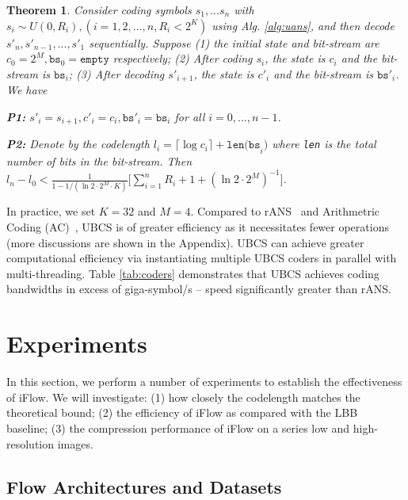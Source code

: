 \documentclass{article}
\newtheorem{theorem}{Theorem}
\begin{document}
\begin{theorem}
Consider coding symbols $s_1, ... s_n$ with $s_i \sim U(0, R_i), (i=1,2,...,n, R_i < 2^K)$ using Alg.  \ref{alg:uans}, and then decode $s'_n, s'_{n-1}, ..., s'_1$ sequentially. Suppose (1) the initial state and bit-stream are $c_0 = 2^M, \texttt{bs}_0 = \texttt{empty}$ respectively; (2) After coding $s_i$, the state is $c_i$ and the bit-stream is $\texttt{bs}_i$; (3) After decoding $s'_{i+1}$, the state is $c'_i$ and the bit-stream is $\texttt{bs}'_i$. We have

\textbf{P1:} $s'_i = s_{i+1}, c'_i = c_i, \texttt{bs}'_i = \texttt{bs}_i$ for all $i=0, ..., n-1$.

\textbf{P2:} Denote by the codelength $l_i = \lceil \log c_i \rceil + \texttt{len(bs}_i\texttt{)}$ where \texttt{len} is the total number of bits in the bit-stream. Then $l_n - l_0 < \frac{1}{1-1/(\ln 2\cdot 2^M \cdot K)} \big[\sum_{i=1}^n R_i + 1 + (\ln 2 \cdot 2^M)^{-1} \big]$.
\label{the:uans}
\end{theorem}



In practice, we set $K=32$ and $M=4$. Compared to rANS~\cite{duda2013asymmetric} and Arithmetric Coding (AC)~\cite{witten1987arithmetic}, UBCS is of greater efficiency as it necessitates fewer operations (more discussions are shown in the Appendix). UBCS can achieve greater computational efficiency via instantiating multiple UBCS coders in parallel with multi-threading. Table \ref{tab:coders} demonstrates that UBCS achieves coding bandwidths in excess of giga-symbol/s -- speed significantly greater than rANS.

\section{Experiments}
\label{sec:exp}

In this section, we perform a number of experiments to establish the effectiveness of iFlow. We will investigate: (1) how closely the codelength matches the theoretical bound; (2) the efficiency of iFlow as compared with the LBB~\cite{ho2019compression} baseline; (3) the compression performance of iFlow on a series low and high-resolution images. 


\subsection{Flow Architectures and Datasets}
\end{document}
